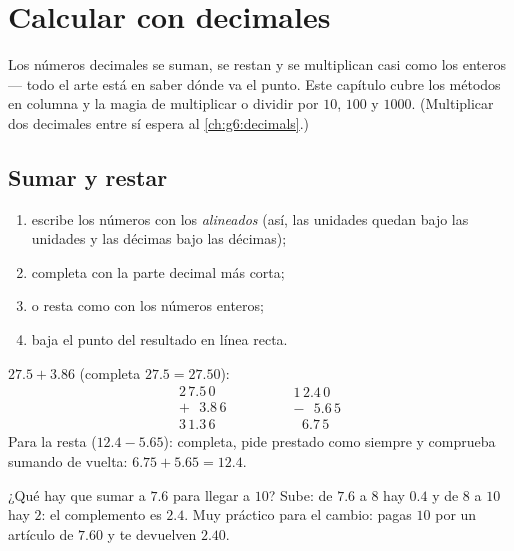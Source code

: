 \chapter{Calcular con decimales}\label{ch:g5:decimalops}

Los números decimales se suman, se restan y se multiplican casi como los enteros
--- todo el arte está en saber dónde va el punto. Este capítulo
cubre los métodos en columna y la magia de multiplicar o dividir por
$10$, $100$ y $1000$. (Multiplicar dos decimales entre sí espera al
\cref{ch:g6:decimals}.)

\section{Sumar y restar}

\begin{method}\label{met:g5:decimalops:addsub}
\begin{enumerate}
  \item escribe los números con los \emph{ alineados}
        (así, las unidades quedan bajo las unidades y las décimas bajo las décimas);
  \item completa con  la parte decimal más corta;
  \item {} o resta como con los números enteros;
  \item baja el punto del resultado en línea recta.
\end{enumerate}
\end{method}

\begin{example}\label{ex:g5:decimalops:addsub}
$27.5 + 3.86$ (completa $27.5 = 27.50$):
\[
\begin{array}{r}
2\,7.5\,0 \\
+\ \ \ 3.8\,6 \\
\hline
3\,1.3\,6
\end{array}
\qquad\qquad
\begin{array}{r}
1\,2.4\,0 \\
-\ \ \ 5.6\,5 \\
\hline
\ \ \,6.7\,5
\end{array}
\]
Para la resta ($12.4 - 5.65$): completa, pide prestado como siempre y comprueba
sumando de vuelta: $6.75 + 5.65 = 12.4$.
\end{example}

\begin{example}\label{ex:g5:decimalops:complement}
¿Qué hay que sumar a $7.6$ para llegar a $10$? Sube: de $7.6$ a $8$ hay
$0.4$ y de $8$ a $10$ hay $2$: el complemento es $2.4$. Muy práctico para el
cambio: pagas $10$ por un artículo de $7.60$ y te devuelven $2.40$.
\end{example}

